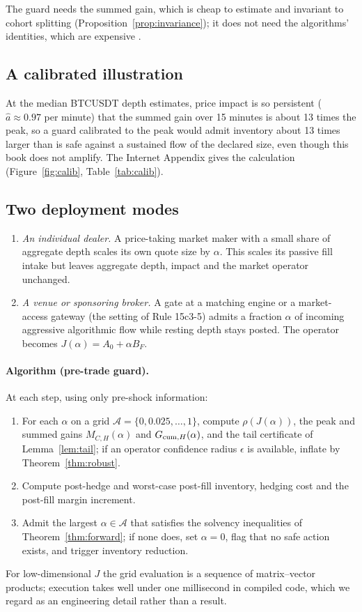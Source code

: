 \documentclass[12pt]{article}
\theoremstyle{definition}
\theoremstyle{remark}
\begin{document}
The guard needs the summed gain, which is cheap to estimate and invariant to cohort splitting (Proposition~\ref{prop:invariance}); it does not need the algorithms' identities, which are expensive \citep{niroula2026}.

\subsection{A calibrated illustration}\label{sec:calib}
At the median BTCUSDT depth estimates, price impact is so persistent ($\hat a\approx0.97$ per minute) that the summed gain over 15 minutes is about 13 times the peak, so a guard calibrated to the peak would admit inventory about 13 times larger than is safe against a sustained flow of the declared size, even though this book does not amplify. The Internet Appendix gives the calculation (Figure~\ref{fig:calib}, Table~\ref{tab:calib}).

\subsection{Two deployment modes}

\begin{enumerate}[label=\textbf{Mode \Alph*.},leftmargin=*]
\item \emph{An individual dealer.} A price-taking market maker with a small share of aggregate depth scales its own quote size by $\alpha$. This scales its passive fill intake but leaves aggregate depth, impact and the market operator unchanged.
\item \emph{A venue or sponsoring broker.} A gate at a matching engine or a market-access gateway (the setting of Rule 15c3-5) admits a fraction $\alpha$ of incoming aggressive algorithmic flow while resting depth stays posted. The operator becomes $J(\alpha)=A_0+\alpha B_F$.
\end{enumerate}

\paragraph{Algorithm (pre-trade guard).} At each step, using only pre-shock information:
\begin{enumerate}[itemsep=1pt]
\item For each $\alpha$ on a grid $\mathcal A=\{0,0.025,\ldots,1\}$, compute $\rho(J(\alpha))$, the peak and summed gains $M_{C,H}(\alpha)$ and $G_{{\rm cum},H}(\alpha)$, and the tail certificate of Lemma~\ref{lem:tail}; if an operator confidence radius $\epsilon$ is available, inflate by Theorem~\ref{thm:robust}.
\item Compute post-hedge and worst-case post-fill inventory, hedging cost and the post-fill margin increment.
\item Admit the largest $\alpha\in\mathcal A$ that satisfies the solvency inequalities of Theorem~\ref{thm:forward}; if none does, set $\alpha=0$, flag that no safe action exists, and trigger inventory reduction.
\end{enumerate}
For low-dimensional $J$ the grid evaluation is a sequence of matrix--vector products; execution takes well under one millisecond in compiled code, which we regard as an engineering detail rather than a result.
\end{document}
